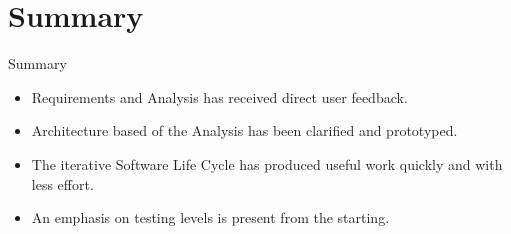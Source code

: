 \documentclass{beamer}
\begin{document}
\section*{Summary}

\begin{frame}{Summary}

\begin{itemize}
\item
Requirements and Analysis has received direct user feedback.
\item
Architecture based of the Analysis has been clarified and prototyped. 
\item 
The iterative Software Life Cycle has produced useful work quickly and with less effort.
\item
An emphasis on testing levels is present from the starting.
\end{itemize}
\end{frame}
\end{document}
